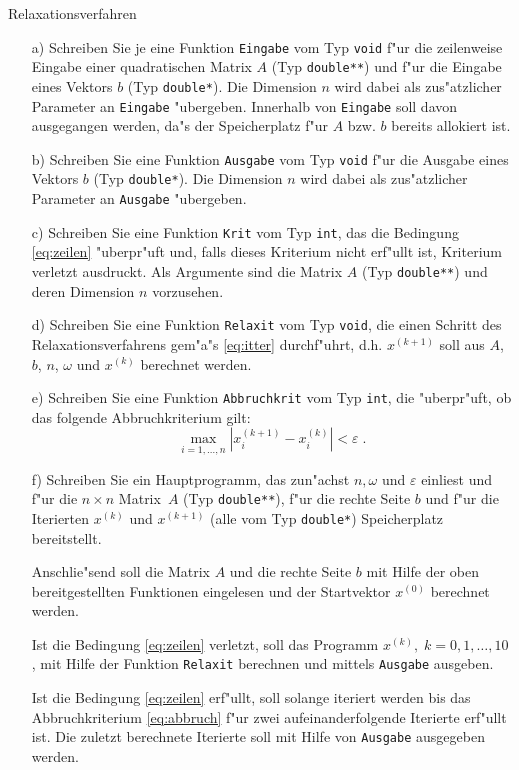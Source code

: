 \begin{exercise}{Relaxationsverfahren}
\begin{body}
\begin{enumerate}
\item[a)] Schreiben Sie je eine Funktion \verb|Eingabe| vom Typ \verb|void| f"ur die zeilenweise Eingabe einer quadratischen Matrix $A$ (Typ \verb|double**|) und f"ur die Eingabe eines Vektors $b$ (Typ \verb|double*|).
  Die Dimension $n$ wird dabei als zus"atzlicher Parameter an \verb|Eingabe| "ubergeben.
  Innerhalb von \verb|Eingabe| soll davon ausgegangen werden, da"s der Speicherplatz f"ur $A$ bzw. $b$ bereits allokiert ist.
\item[b)] Schreiben Sie eine Funktion \verb|Ausgabe| vom Typ \verb|void| f"ur die Ausgabe eines Vektors $b$ (Typ \verb|double*|).
  Die Dimension $n$ wird dabei als zus"atzlicher Parameter an \verb|Ausgabe| "ubergeben.
\item[c)] Schreiben Sie eine Funktion \verb|Krit| vom Typ \verb|int|, das die Bedingung \eqref{eq:zeilen} "uberpr"uft und, falls dieses
  Kriterium nicht erf"ullt ist, {\grqq Kriterium verletzt\grqq} ausdruckt.
  Als Argumente sind die Matrix $A$ (Typ \verb|double**|) und deren Dimension $n$ vorzusehen.
\item[d)] Schreiben Sie eine Funktion \verb|Relaxit| vom Typ \verb|void|, die einen Schritt des Relaxationsverfahrens gem"a"s \eqref{eq:itter} durchf"uhrt, d.h. $x^{(k+1)}$ soll aus $A$, $b$, $n$, $\omega$ und $x^{(k)}$ berechnet werden.
\item[e)] Schreiben Sie eine Funktion \verb|Abbruchkrit| vom Typ \verb|int|, die "uberpr"uft, ob das folgende Abbruchkriterium gilt:
  \begin{equation}
    \label{eq:abbruch}
    \max\limits_{i = 1,\ldots,n} \left| {x_i^{(k + 1)}  - x_i^{(k)} } \right|
    < \varepsilon \; .
  \end{equation}
\item[f)] Schreiben Sie ein Hauptprogramm, das zun"achst $n, \omega$ und $\varepsilon$ einliest und f"ur die $n \times n$ Matrix~$A$ (Typ \verb|double**|), f"ur die rechte Seite $b$ und f"ur die Iterierten $x^{(k)}$ und $x^{(k+1)}$ (alle vom Typ \verb|double*|) Speicherplatz bereitstellt.

   Anschlie"send soll die Matrix $A$ und die rechte Seite $b$ mit Hilfe der oben bereitgestellten Funktionen eingelesen und der Startvektor $x^{(0)}$ berechnet werden.

   Ist die Bedingung \eqref{eq:zeilen} verletzt, soll das Programm $x^{(k)},\; k=0,1,\ldots,10$, mit Hilfe der Funktion \verb|Relaxit| berechnen und mittels \verb|Ausgabe| ausgeben.

   Ist die Bedingung \eqref{eq:zeilen} erf"ullt, soll solange iteriert werden bis das Abbruchkriterium \eqref{eq:abbruch} f"ur zwei aufeinanderfolgende Iterierte erf"ullt ist.
   Die zuletzt berechnete Iterierte soll mit Hilfe von \verb|Ausgabe| ausgegeben werden.
\end{enumerate}
\end{body}
\begin{solution}
\end{solution}
\end{exercise}
